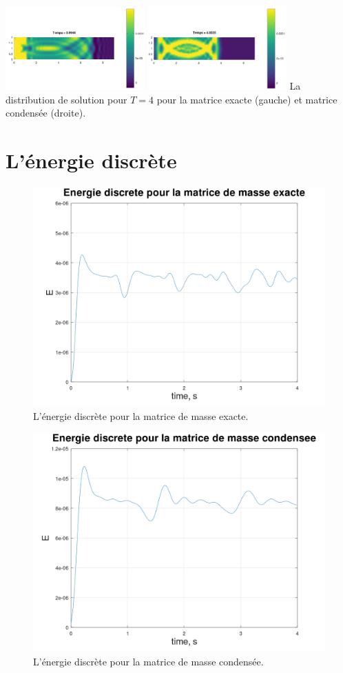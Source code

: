 \documentclass[12pt]{article}
\begin{document}
\begin{center}
	\hspace{1cm}\includegraphics[width=0.4\textwidth]{images/T4.png}\hspace{1cm}
	\includegraphics[width=0.4\textwidth]{images/Tcond4.png}\hspace{1cm}
	{La distribution de solution pour $T = 4$ pour la matrice exacte (gauche) et matrice condensée (droite)}.
\end{center}
\section{L'énergie discrète}	
\begin{figure}
	\centering
	\includegraphics[height=0.4\linewidth]{images/E_01}
	\caption{L'énergie discrète pour la matrice de masse exacte.}
	\label{fig:energie_e}
\end{figure}
\begin{figure}
	\centering
	\includegraphics[height=0.4\linewidth]{images/E_cond_01}
	\caption{L'énergie discrète pour la matrice de masse condensée.}
	\label{fig:energie_c}
\end{figure}	
\end{document}
